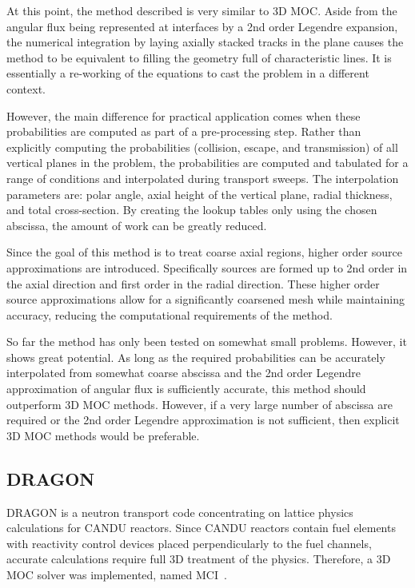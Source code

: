 At this point, the method described is very similar to 3D \ac{MOC}. Aside from the angular flux being represented at interfaces by a 2nd order Legendre expansion, the numerical integration by laying axially stacked tracks in the plane causes the method to be equivalent to filling the geometry full of characteristic lines. It is essentially a re-working of the equations to cast the problem in a different context.

However, the main difference for practical application comes when these probabilities are computed as part of a pre-processing step. Rather than explicitly computing the probabilities (collision, escape, and transmission) of all vertical planes in the problem, the probabilities are computed and tabulated for a range of conditions and interpolated during transport sweeps. The interpolation parameters are: polar angle, axial height of the vertical plane, radial thickness, and total cross-section. By creating the lookup tables only using the chosen abscissa, the amount of work can be greatly reduced.

Since the goal of this method is to treat coarse axial regions, higher order source approximations are introduced. Specifically sources are formed up to 2nd order in the axial direction and first order in the radial direction. These higher order source approximations allow for a significantly coarsened mesh while maintaining accuracy, reducing the computational requirements of the method.

So far the method has only been tested on somewhat small problems. However, it shows great potential. As long as the required probabilities can be accurately interpolated from somewhat coarse abscissa and the 2nd order Legendre approximation of angular flux is sufficiently accurate, this method should outperform 3D \ac{MOC} methods. However, if a very large number of abscissa are required or the 2nd order Legendre approximation is not sufficient, then explicit 3D \ac{MOC} methods would be preferable. 

\subsection{DRAGON}
\label{sec:dragon}
DRAGON is a neutron transport code concentrating on lattice physics calculations for CANDU reactors. Since CANDU reactors contain fuel elements with reactivity control devices placed perpendicularly to the fuel channels, accurate calculations require full 3D treatment of the physics. Therefore, a 3D \ac{MOC} solver was implemented, named MCI~\cite{dragon_3d_moc}. 

